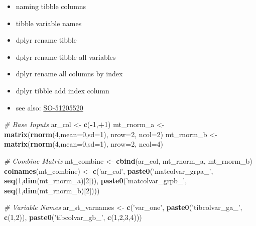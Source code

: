 \documentclass[
]{book}
\newenvironment{Shaded}{\begin{snugshade}}{\end{snugshade}}
\newcommand{\CommentTok}[1]{\textcolor[rgb]{0.56,0.35,0.01}{\textit{#1}}}
\newcommand{\DataTypeTok}[1]{\textcolor[rgb]{0.13,0.29,0.53}{#1}}
\newcommand{\DecValTok}[1]{\textcolor[rgb]{0.00,0.00,0.81}{#1}}
\newcommand{\KeywordTok}[1]{\textcolor[rgb]{0.13,0.29,0.53}{\textbf{#1}}}
\newcommand{\NormalTok}[1]{#1}
\newcommand{\OperatorTok}[1]{\textcolor[rgb]{0.81,0.36,0.00}{\textbf{#1}}}
\newcommand{\StringTok}[1]{\textcolor[rgb]{0.31,0.60,0.02}{#1}}
\providecommand{\tightlist}{%
  \setlength{\itemsep}{0pt}\setlength{\parskip}{0pt}}
\begin{document}
\begin{itemize}
\tightlist
\item
  naming tibble columns
\item
  tibble variable names
\item
  dplyr rename tibble
\item
  dplyr rename tibble all variables
\item
  dplyr rename all columns by index
\item
  dplyr tibble add index column
\item
  see also: \href{https://stackoverflow.com/questions/45535157/difference-between-dplyrrename-and-dplyrrename-all}{SO-51205520}
\end{itemize}

\begin{Shaded}
\begin{Highlighting}[]
\CommentTok{# Base Inputs}
\NormalTok{ar_col <-}\StringTok{ }\KeywordTok{c}\NormalTok{(}\OperatorTok{-}\DecValTok{1}\NormalTok{,}\OperatorTok{+}\DecValTok{1}\NormalTok{)}
\NormalTok{mt_rnorm_a <-}\StringTok{ }\KeywordTok{matrix}\NormalTok{(}\KeywordTok{rnorm}\NormalTok{(}\DecValTok{4}\NormalTok{,}\DataTypeTok{mean=}\DecValTok{0}\NormalTok{,}\DataTypeTok{sd=}\DecValTok{1}\NormalTok{), }\DataTypeTok{nrow=}\DecValTok{2}\NormalTok{, }\DataTypeTok{ncol=}\DecValTok{2}\NormalTok{)}
\NormalTok{mt_rnorm_b <-}\StringTok{ }\KeywordTok{matrix}\NormalTok{(}\KeywordTok{rnorm}\NormalTok{(}\DecValTok{4}\NormalTok{,}\DataTypeTok{mean=}\DecValTok{0}\NormalTok{,}\DataTypeTok{sd=}\DecValTok{1}\NormalTok{), }\DataTypeTok{nrow=}\DecValTok{2}\NormalTok{, }\DataTypeTok{ncol=}\DecValTok{4}\NormalTok{)}

\CommentTok{# Combine Matrix}
\NormalTok{mt_combine <-}\StringTok{ }\KeywordTok{cbind}\NormalTok{(ar_col, mt_rnorm_a, mt_rnorm_b)}
\KeywordTok{colnames}\NormalTok{(mt_combine) <-}\StringTok{ }\KeywordTok{c}\NormalTok{(}\StringTok{'ar_col'}\NormalTok{,}
                          \KeywordTok{paste0}\NormalTok{(}\StringTok{'matcolvar_grpa_'}\NormalTok{, }\KeywordTok{seq}\NormalTok{(}\DecValTok{1}\NormalTok{,}\KeywordTok{dim}\NormalTok{(mt_rnorm_a)[}\DecValTok{2}\NormalTok{])),}
                          \KeywordTok{paste0}\NormalTok{(}\StringTok{'matcolvar_grpb_'}\NormalTok{, }\KeywordTok{seq}\NormalTok{(}\DecValTok{1}\NormalTok{,}\KeywordTok{dim}\NormalTok{(mt_rnorm_b)[}\DecValTok{2}\NormalTok{])))}

\CommentTok{# Variable Names}
\NormalTok{ar_st_varnames <-}\StringTok{ }\KeywordTok{c}\NormalTok{(}\StringTok{'var_one'}\NormalTok{,}
                    \KeywordTok{paste0}\NormalTok{(}\StringTok{'tibcolvar_ga_'}\NormalTok{, }\KeywordTok{c}\NormalTok{(}\DecValTok{1}\NormalTok{,}\DecValTok{2}\NormalTok{)),}
                    \KeywordTok{paste0}\NormalTok{(}\StringTok{'tibcolvar_gb_'}\NormalTok{, }\KeywordTok{c}\NormalTok{(}\DecValTok{1}\NormalTok{,}\DecValTok{2}\NormalTok{,}\DecValTok{3}\NormalTok{,}\DecValTok{4}\NormalTok{)))}


\end{Highlighting}
\end{Shaded}
\end{document}
